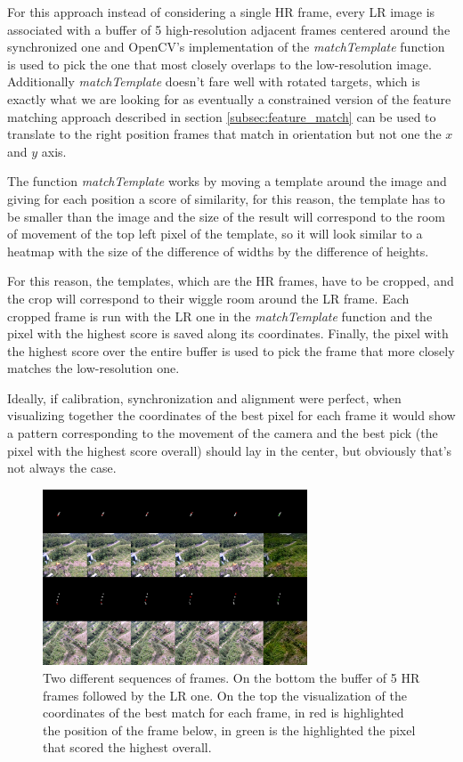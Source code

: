 For this approach instead of considering a single HR frame, every LR image is associated with a buffer of 5 high-resolution adjacent frames centered around the synchronized one and OpenCV's implementation of the \emph{matchTemplate} function is used to pick the one that most closely overlaps to the low-resolution image. Additionally \emph{matchTemplate} doesn't fare well with rotated targets, which is exactly what we are looking for as eventually a constrained version of the feature matching approach described in section \ref{subsec:feature_match} can be used to translate to the right position frames that match in orientation but not one the \(x\) and \(y\) axis.\newline

The function \emph{matchTemplate} works by moving a template around the image and giving for each position a score of similarity, for this reason, the template has to be smaller than the image and the size of the result will correspond to the room of movement of the top left pixel of the template, so it will look similar to a heatmap with the size of the difference of widths by the difference of heights.

For this reason, the templates, which are the HR frames, have to be cropped, and the crop will correspond to their wiggle room around the LR frame. Each cropped frame is run with the LR one in the \emph{matchTemplate} function and the pixel with the highest score is saved along its coordinates. Finally, the pixel with the highest score over the entire buffer is used to pick the frame that more closely matches the low-resolution one.

Ideally, if calibration, synchronization and alignment were perfect, when visualizing together the coordinates of the best pixel for each frame it would show a pattern corresponding to the movement of the camera and the best pick (the pixel with the highest score overall) should lay in the center, but obviously that's not always the case.

\begin{figure}[H]
  \centering
  \includegraphics[width=0.7\textwidth]{figures/matchtemplate.png}
  \caption{Two different sequences of frames. On the bottom the buffer of 5 HR frames followed by the LR one. On the top the visualization of the coordinates of the best match for each frame, in red is highlighted the position of the frame below, in green is the highlighted the pixel that scored the highest overall.}
  \label{img:matchtempl}
\end{figure}

